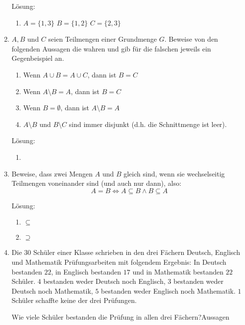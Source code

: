 \documentclass[main.tex]{subfiles}
\begin{document}
\begin{enumerate}
	      Lösung:
	      \begin{enumerate}
		      \item \( A = \{1 ,3\} \)
		            \( B = \{1 ,2\} \)
		            \( C = \{2 ,3\} \)
	      \end{enumerate}
	\item \( A, B \) und \( C \) seien Teilmengen einer Grundmenge \( G \).
	      Beweise von den folgenden Aussagen die wahren und gib für die falschen jeweils ein Gegenbeispiel an.
	      \begin{enumerate}
		      \item Wenn \( A \cup B = A \cup C \), dann ist \( B = C \)
		      \item Wenn \( A \setminus B = A \), dann ist \( B = C \)
		      \item Wenn \( B = \emptyset \), dann ist \(  A \setminus B  = A \)
		      \item \( A \setminus B  \) und \( B \setminus C \) sind immer disjunkt
		            (d.h. die Schnittmenge ist leer).
	      \end{enumerate}

	      Lösung:
	      \begin{enumerate}
		      \item
	      \end{enumerate}
	\item Beweise, dass zwei Mengen \( A \) und \( B \) gleich sind,
	      wenn sie wechselseitig Teilmengen voneinander sind (und auch nur dann),
	      also:
	      \[ A = B \Leftrightarrow A \subseteq B \land B \subseteq A \]

	      Lösung:
	      \begin{enumerate}
		      \item \( \subseteq \)
		      \item \( \supseteq \)
	      \end{enumerate}
	\item Die \( 30 \) Schüler einer Klasse schrieben in den drei Fächern
	      Deutsch, Englisch und Mathematik Prüfungsarbeiten mit folgendem Ergebnis:
	      In Deutsch bestanden \( 22 \), in Englisch bestanden \( 17 \)
	      und in Mathematik bestanden \( 22 \) Schüler.
	      \( 4 \) bestanden weder Deutsch noch Englisch,
	      \( 3 \) bestanden weder Deutsch noch Mathematik,
	      \( 5 \) bestanden weder Englisch noch Mathematik.
	      \( 1 \) Schüler schaffte keine der drei Prüfungen.

	      Wie viele Schüler bestanden die Prüfung in allen drei Fächern?Aussagen


\end{enumerate}
\end{document}

